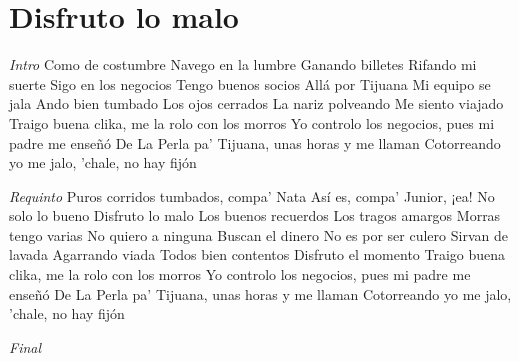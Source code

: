 \section{Disfruto lo malo}

\noindent
\vspace{1cm}

\begin{guitar}
	\begin{multicols}{2}

		\textit{Intro}
		Como de costumbre
		Navego en la lumbre
		Ganando billetes
		Rifando mi suerte
		Sigo en los negocios
		Tengo buenos socios
		Allá por Tijuana
		Mi equipo se jala
		Ando bien tumbado
		Los ojos cerrados
		La nariz polveando
		Me siento viajado
		Traigo buena clika, me la rolo con los morros
		Yo controlo los negocios, pues mi padre me enseñó
		De La Perla pa' Tijuana, unas horas y me llaman
		Cotorreando yo me jalo, 'chale, no hay fijón

		\textit{Requinto}
		Puros corridos tumbados, compa' Nata
		Así es, compa' Junior, ¡ea!
		No solo lo bueno
		Disfruto lo malo
		Los buenos recuerdos
		Los tragos amargos
		Morras tengo varias
		No quiero a ninguna
		Buscan el dinero
		No es por ser culero
		Sirvan de lavada
		Agarrando viada
		Todos bien contentos
		Disfruto el momento
		Traigo buena clika, me la rolo con los morros
		Yo controlo los negocios, pues mi padre me enseñó
		De La Perla pa' Tijuana, unas horas y me llaman
		Cotorreando yo me jalo, 'chale, no hay fijón

	\textit{Final}
	\end{multicols}
\end{guitar}
